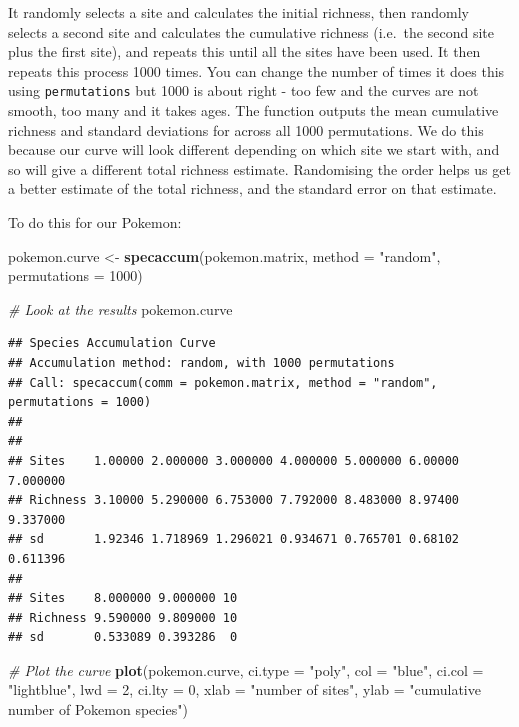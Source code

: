 \documentclass[]{book}
\newenvironment{Shaded}{\begin{snugshade}}{\end{snugshade}}
\newcommand{\KeywordTok}[1]{\textcolor[rgb]{0.13,0.29,0.53}{\textbf{{#1}}}}
\newcommand{\DataTypeTok}[1]{\textcolor[rgb]{0.13,0.29,0.53}{{#1}}}
\newcommand{\DecValTok}[1]{\textcolor[rgb]{0.00,0.00,0.81}{{#1}}}
\newcommand{\StringTok}[1]{\textcolor[rgb]{0.31,0.60,0.02}{{#1}}}
\newcommand{\CommentTok}[1]{\textcolor[rgb]{0.56,0.35,0.01}{\textit{{#1}}}}
\newcommand{\NormalTok}[1]{{#1}}
\begin{document}
It randomly selects a site and calculates the initial richness, then
randomly selects a second site and calculates the cumulative richness
(i.e.~the second site plus the first site), and repeats this until all
the sites have been used. It then repeats this process 1000 times. You
can change the number of times it does this using \texttt{permutations}
but 1000 is about right - too few and the curves are not smooth, too
many and it takes ages. The function outputs the mean cumulative
richness and standard deviations for across all 1000 permutations. We do
this because our curve will look different depending on which site we
start with, and so will give a different total richness estimate.
Randomising the order helps us get a better estimate of the total
richness, and the standard error on that estimate.

To do this for our Pokemon:

\begin{Shaded}
\begin{Highlighting}[]
\NormalTok{pokemon.curve <-}\StringTok{ }\KeywordTok{specaccum}\NormalTok{(pokemon.matrix, }\DataTypeTok{method =} \StringTok{"random"}\NormalTok{, }\DataTypeTok{permutations =} \DecValTok{1000}\NormalTok{)}

\CommentTok{# Look at the results}
\NormalTok{pokemon.curve}
\end{Highlighting}
\end{Shaded}

\begin{verbatim}
## Species Accumulation Curve
## Accumulation method: random, with 1000 permutations
## Call: specaccum(comm = pokemon.matrix, method = "random", permutations = 1000) 
## 
##                                                                      
## Sites    1.00000 2.000000 3.000000 4.000000 5.000000 6.00000 7.000000
## Richness 3.10000 5.290000 6.753000 7.792000 8.483000 8.97400 9.337000
## sd       1.92346 1.718969 1.296021 0.934671 0.765701 0.68102 0.611396
##                              
## Sites    8.000000 9.000000 10
## Richness 9.590000 9.809000 10
## sd       0.533089 0.393286  0
\end{verbatim}

\begin{Shaded}
\begin{Highlighting}[]
\CommentTok{# Plot the curve}
\KeywordTok{plot}\NormalTok{(pokemon.curve, }\DataTypeTok{ci.type =} \StringTok{"poly"}\NormalTok{, }\DataTypeTok{col =} \StringTok{"blue"}\NormalTok{, }\DataTypeTok{ci.col =} \StringTok{"lightblue"}\NormalTok{, }
     \DataTypeTok{lwd =} \DecValTok{2}\NormalTok{, }\DataTypeTok{ci.lty =} \DecValTok{0}\NormalTok{, }\DataTypeTok{xlab =} \StringTok{"number of sites"}\NormalTok{, }
     \DataTypeTok{ylab =} \StringTok{"cumulative number of Pokemon species"}\NormalTok{)}
\end{Highlighting}
\end{Shaded}
\end{document}
